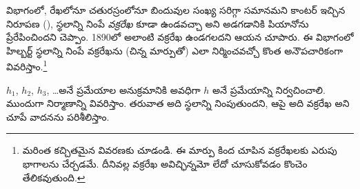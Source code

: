 \documentclass[../../../include/open-logic-section]{subfiles}
\begin{document}


 విభాగంలో, రేఖలోనూ చతురస్రంలోనూ బిందువుల సంఖ్య సరిగ్గా సమానమని కాంటర్ ఇచ్చిన నిరూపణ (), స్థలాన్ని నింపే \emph{వక్రరేఖ} కూడా ఉండవచ్చా అని అడగడానికి పియానోను ప్రేరేపించిందని చెప్పాం. 1890లో అలాంటి వక్రరేఖ ఉండగలదని ఆయన చూపారు. ఈ విభాగంలో హిల్బర్ట్ స్థలాన్ని నింపే వక్రరేఖను (చిన్న మార్పుతో) ఎలా నిర్మించవచ్చో కొంత అనౌపచారికంగా వివరిస్తాం.\footnote{మరింత కచ్చితమైన వివరణకు \cite{Rose2010} చూడండి. ఈ మార్పు కింద చూపిన వక్రరేఖలకు ఎరుపు భాగాలను చేర్చడమే. దీనివల్ల వక్రరేఖ అవిచ్ఛిన్నమో లేదో చూసుకోవడం కొంచెం తేలికవుతుంది.}

$h_1$, $h_2$, $h_3$, \dots\@ అనే ప్రమేయాల అనుక్రమానికి అవధిగా $h$ అనే ప్రమేయాన్ని నిర్వచించాలి. ముందుగా నిర్మాణాన్ని వివరిస్తాం. తరువాత అది స్థలాన్ని నింపుతుందని, ఆపై అది వక్రరేఖ అని చూపే వాదనను పరిశీలిస్తాం.
\end{document}
